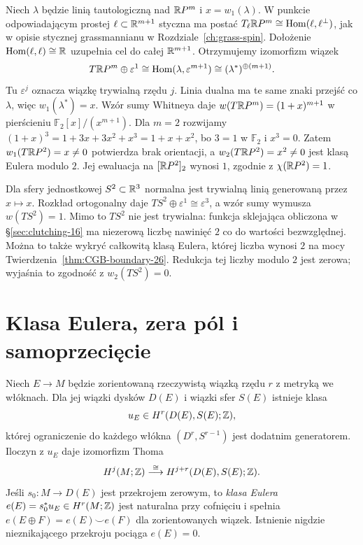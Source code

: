 \begin{przyklad}
\label{prz:sw-rp2-21}
Niech $\lambda$ będzie linią tautologiczną nad $\mathbb{R} P^m$
i $x=w_1(\lambda)$.
W punkcie odpowiadającym prostej $\ell\subset\mathbb{R}^{m+1}$
styczna ma postać
$T_\ell\mathbb{R} P^m\cong\operatorname{Hom}(\ell,\ell^\perp)$,
jak w opisie stycznej grassmannianu w Rozdziale~\ref{ch:grass-spin}.
Dołożenie $\operatorname{Hom}(\ell,\ell)\cong\mathbb{R}$
uzupełnia cel do całej $\mathbb{R}^{m+1}$.
Otrzymujemy izomorfizm wiązek
\[
 T\mathbb{R} P^m\oplus\varepsilon^1
 \cong\operatorname{Hom}(\lambda,\varepsilon^{m+1})
 \cong(\lambda^*)^{\oplus(m+1)}.
\]
Tu $\varepsilon^j$ oznacza wiązkę trywialną rzędu $j$.
Linia dualna ma te same znaki przejść co $\lambda$,
więc $w_1(\lambda^*)=x$.
Wzór sumy Whitneya daje
$w(T\mathbb{R} P^m)=(1+x)^{m+1}$
w pierścieniu $\mathbb F_2[x]/(x^{m+1})$.
Dla $m=2$ rozwijamy
$(1+x)^3=1+3x+3x^2+x^3=1+x+x^2$,
bo $3=1$ w $\mathbb F_2$ i $x^3=0$.
Zatem $w_1(T\mathbb{R} P^2)=x\ne0$ potwierdza brak orientacji,
a $w_2(T\mathbb{R} P^2)=x^2\ne0$ jest klasą Eulera modulo $2$.
Jej ewaluacja na $[\mathbb{R} P^2]_2$ wynosi $1$,
zgodnie z $\chi(\mathbb{R} P^2)=1$.
\end{przyklad}

\begin{przyklad}
\label{prz:sw-sfera-stabilna-21}
Dla sfery jednostkowej $S^2\subset\mathbb{R}^3$ normalna
jest trywialną linią generowaną przez $x\mapsto x$.
Rozkład ortogonalny daje
$TS^2\oplus\varepsilon^1\cong\varepsilon^3$,
a wzór sumy wymusza $w(TS^2)=1$.
Mimo to $TS^2$ nie jest trywialna:
funkcja sklejająca obliczona w §\ref{sec:clutching-16}
ma niezerową liczbę nawinięć $2$ co do wartości bezwzględnej.
Można to także wykryć całkowitą klasą Eulera,
której liczba wynosi $2$ na mocy
Twierdzenia~\ref{thm:CGB-boundary-26}.
Redukcja tej liczby modulo $2$ jest zerowa;
wyjaśnia to zgodność z $w_2(TS^2)=0$.
\end{przyklad}

\section{Klasa Eulera, zera pól i samoprzecięcie}
\label{sec:klasy-eulera-16}

\begin{twierdzenie}
\label{thm:euler-thom-16}
Niech $E\to M$ będzie
zorientowaną rzeczywistą
wiązką rzędu $r$ z metryką
we włóknach. Dla jej
wiązki dysków $D(E)$
i wiązki sfer $S(E)$
istnieje klasa
\[
 u_E\in H^r(D(E),S(E);\mathbb{Z}),
\]
której ograniczenie do
każdego włókna
$(D^r,S^{r-1})$ jest
dodatnim generatorem.
Iloczyn z $u_E$ daje
izomorfizm Thoma
\[
 H^j(M;\mathbb{Z})\stackrel{\cong}{\longrightarrow}
 H^{j+r}(D(E),S(E);\mathbb{Z}).
\]
Jeśli $s_0:M\to D(E)$
jest przekrojem zerowym,
to \emph{klasa Eulera}
$e(E)=s_0^*u_E\in H^r(M;\mathbb{Z})$
jest naturalna przy
cofnięciu i spełnia
$e(E\oplus F)=e(E)\smile e(F)$
dla zorientowanych wiązek.
Istnienie nigdzie nieznikającego
przekroju pociąga $e(E)=0$.
\end{twierdzenie}

